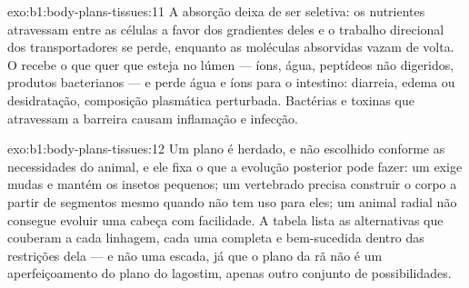 \begin{solution}{exo:b1:body-plans-tissues:11}
A absorção deixa de ser seletiva: os nutrientes atravessam entre as
células a favor dos gradientes deles e o trabalho direcional dos
transportadores se perde, enquanto as moléculas absorvidas vazam de
volta. O  recebe o que quer que esteja no lúmen --- íons,
água, peptídeos não digeridos, produtos bacterianos --- e perde água e
íons para o intestino: diarreia, edema ou desidratação, composição
plasmática perturbada. Bactérias e toxinas que atravessam a barreira
causam inflamação e infecção.
\end{solution}

\begin{solution}{exo:b1:body-plans-tissues:12}
Um plano é herdado, e não escolhido conforme as necessidades do animal,
e ele fixa o que a evolução posterior pode fazer: um  exige
mudas e mantém os insetos pequenos; um vertebrado precisa construir o
corpo a partir de segmentos mesmo quando não tem uso para eles; um
animal radial não consegue evoluir uma cabeça com facilidade. A tabela
lista as alternativas que couberam a cada linhagem, cada uma completa e
bem-sucedida dentro das restrições dela --- e não uma escada, já que o
plano da rã não é um aperfeiçoamento do plano do lagostim, apenas outro
conjunto de possibilidades.
\end{solution}

